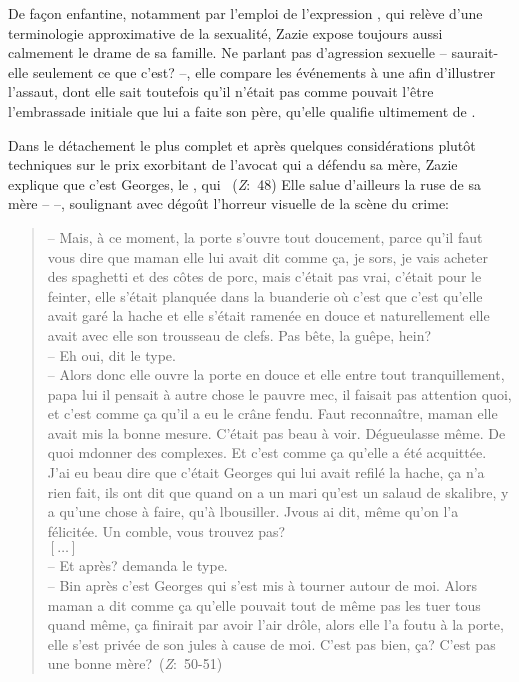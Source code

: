 De façon enfantine, notamment par l'emploi de l'expression , qui relève d'une terminologie approximative de la sexualité, Zazie expose toujours aussi calmement le drame de sa famille.
Ne parlant pas d'agression sexuelle -- saurait-elle seulement ce que c'est? --, elle compare les événements à une  afin d'illustrer l'assaut, dont elle sait toutefois qu'il n'était pas  comme pouvait l'être l'embrassade initiale que lui a faite son père, qu'elle qualifie ultimement de .
\par
Dans le détachement le plus complet et après quelques considérations plutôt techniques sur le prix exorbitant de l'avocat qui a défendu sa mère, Zazie explique que c'est Georges, le , qui ~(\textit{Z}:~48)
Elle salue d'ailleurs la ruse de sa mère --  --, soulignant avec dégoût l'horreur visuelle de la scène du crime:
\begin{quote}
  \begin{singlespace}
    \small
    -- Mais, à ce moment, la porte s'ouvre tout doucement, parce qu'il faut vous dire que maman elle lui avait dit comme ça, je sors, je vais acheter des spaghetti et des côtes de porc, mais c'était pas vrai, c'était pour le feinter, elle s'était planquée dans la buanderie où c'est que c'est qu'elle avait garé la hache et elle s'était ramenée en douce et naturellement elle avait avec elle son trousseau de clefs. Pas bête, la guêpe, hein?\\
    -- Eh oui, dit le type.\\
    -- Alors donc elle ouvre la porte en douce et elle entre tout tranquillement, papa lui il pensait à autre chose le pauvre mec, il faisait pas attention quoi, et c'est comme ça qu'il a eu le crâne fendu. Faut reconnaître, maman elle avait mis la bonne mesure. C'était pas beau à voir. Dégueulasse même. De quoi mdonner des complexes. Et c'est comme ça qu'elle a été acquittée. J'ai eu beau dire que c'était Georges qui lui avait refilé la hache, ça n'a rien fait, ils ont dit que quand on a un mari qu'est un salaud de skalibre, y a qu'une chose à faire, qu'à lbousiller. Jvous ai dit, même qu'on l'a félicitée. Un comble, vous trouvez pas?\\
    $\left[ \dots \right]$\\
    -- Et après? demanda le type.\\
    -- Bin après c'est Georges qui s'est mis à tourner autour de moi. Alors maman a dit comme ça qu'elle pouvait tout de même pas les tuer tous quand même, ça finirait par avoir l'air drôle, alors elle l'a foutu à la porte, elle s'est privée de son jules à cause de moi. C'est pas bien, ça? C'est pas une bonne mère?~(\textit{Z}:~50-51)
    \normalsize
  \end{singlespace}
\end{quote}
